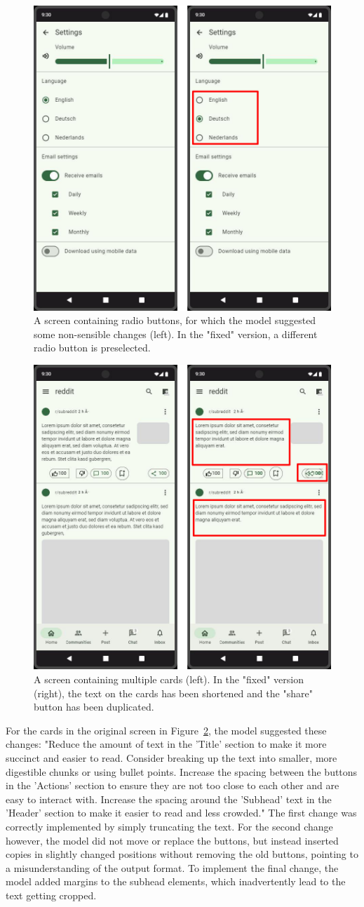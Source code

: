 \documentclass[11pt,titlepage,oneside,openany]{book}
\begin{document}
\begin{figure}[H]
	\centering
	\includegraphics[width=.56\textwidth]{figures/change_bad_ex_ts_1.jpg}
	\caption{A screen containing radio buttons, for which the model suggested some non-sensible changes (left). In the "fixed" version, a different radio button is preselected.}
	\label{fig:change_bad_ex_ts_1}
\end{figure}

\begin{figure}[H]
	\centering
	\includegraphics[width=.56\textwidth]{figures/change_bad_ex_ts_2.jpg}
	\caption{A screen containing multiple cards (left). In the "fixed" version (right), the text on the cards has been shortened and the "share" button has been duplicated.}
	\label{fig:change_bad_ex_ts_2}
\end{figure}

For the cards in the original screen in Figure~\ref{fig:change_bad_ex_ts_2}, the model suggested these changes: "Reduce the amount of text in the 'Title' section to make it more succinct and easier to read. Consider breaking up the text into smaller, more digestible chunks or using bullet points. Increase the spacing between the buttons in the 'Actions' section to ensure they are not too close to each other and are easy to interact with. Increase the spacing around the 'Subhead' text in the 'Header' section to make it easier to read and less crowded." The first change was correctly implemented by simply truncating the text. For the second change however, the model did not move or replace the buttons, but instead inserted copies in slightly changed positions without removing the old buttons, pointing to a misunderstanding of the output format. To implement the final change, the model added margins to the subhead elements, which inadvertently lead to the text getting cropped. 
\end{document}
